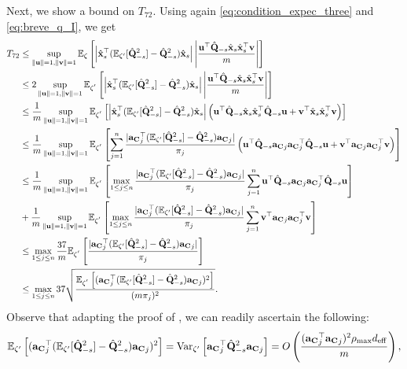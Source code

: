 \documentclass[11pt,a4paper]{article}
\begin{document}
Next, we show a bound on $T_{72}$.
Using again \eqref{eq:condition_expec_three} and \eqref{eq:breve_q_I}, we get
\begin{align}
    T_{72}&\leq\sup\limits_{\|\mathbf{u}\|=1,\|\mathbf{v}\|=1} {\mathbb{E}}_{\zeta}\left[\left|\hat{\mathbf{x}}_s^\top({\mathbb{E}}_{\zeta'}[\hat{\mathbf{Q}}^2_{-s}]-\hat{\mathbf{Q}}^2_{-s})\hat{\mathbf{x}}_s\right |\left|\frac{\mathbf{u}^\top\hat{\mathbf{Q}}_{-s}\hat{\mathbf{x}}_s\hat{\mathbf{x}}_s^\top\mathbf{v}}{m}\right|\right]\nonumber\\
    &\leq2\sup\limits_{\|\mathbf{u}\|=1,\|\mathbf{v}\|=1} {\mathbb{E}}_{\zeta^{'}}\left[\left|\hat{\mathbf{x}}_s^\top({\mathbb{E}}_{\zeta'}[\hat{\mathbf{Q}}^2_{-s}]-\hat{\mathbf{Q}}^2_{-s})\hat{\mathbf{x}}_s\right |\left|\frac{\mathbf{u}^\top\hat{\mathbf{Q}}_{-s}\hat{\mathbf{x}}_s\hat{\mathbf{x}}_s^\top\mathbf{v}}{m}\right|\right]\nonumber\\
    &\leq\frac{1}{m}\sup\limits_{\|\mathbf{u}\|=1,\|\mathbf{v}\|=1} {\mathbb{E}}_{\zeta^{'}}\left[\left|\hat{\mathbf{x}}_s^\top({\mathbb{E}}_{\zeta'}[\hat{\mathbf{Q}}^2_{-s}]-\hat{\mathbf{Q}}^2_{-s})\hat{\mathbf{x}}_s\right |\left(\mathbf{u}^\top\hat{\mathbf{Q}}_{-s}\hat{\mathbf{x}}_s\hat{\mathbf{x}}_s^\top\hat{\mathbf{Q}}_{-s}\mathbf{u}+\mathbf{v}^\top\hat{\mathbf{x}}_s\hat{\mathbf{x}}_s^\top\mathbf{v}\right)\right]\nonumber\\
    &\leq\frac{1}{m}\sup\limits_{\|\mathbf{u}\|=1,\|\mathbf{v}\|=1} {\mathbb{E}}_{\zeta^{'}}\left[\sum^n_{j=1}\frac{|{\mathbf{a}_{\mathbf{C}}}_j^\top({\mathbb{E}}_{\zeta'}[\hat{\mathbf{Q}}^2_{-s}]-\hat{\mathbf{Q}}^2_{-s}){\mathbf{a}_{\mathbf{C}}}_j|}{\pi_j}\left(\mathbf{u}^\top\hat{\mathbf{Q}}_{-s}{\mathbf{a}_{\mathbf{C}}}_j{\mathbf{a}_{\mathbf{C}}}_j^\top\hat{\mathbf{Q}}_{-s}\mathbf{u}+\mathbf{v}^\top{\mathbf{a}_{\mathbf{C}}}_j{\mathbf{a}_{\mathbf{C}}}_j^\top\mathbf{v}\right)\right]\nonumber\\
    &\leq\frac{1}{m}\sup\limits_{\|\mathbf{u}\|=1,\|\mathbf{v}\|=1} {\mathbb{E}}_{\zeta^{'}}\left[\max\limits_{1\leq j\leq n}\frac{|{\mathbf{a}_{\mathbf{C}}}_j^\top({\mathbb{E}}_{\zeta'}[\hat{\mathbf{Q}}^2_{-s}]-\hat{\mathbf{Q}}^2_{-s}){\mathbf{a}_{\mathbf{C}}}_j|}{\pi_j}\sum^n_{j=1}\mathbf{u}^\top\hat{\mathbf{Q}}_{-s}{\mathbf{a}_{\mathbf{C}}}_j{\mathbf{a}_{\mathbf{C}}}_j^\top\hat{\mathbf{Q}}_{-s}\mathbf{u}\right]\nonumber\\
    &+\frac{1}{m}\sup\limits_{\|\mathbf{u}\|=1,\|\mathbf{v}\|=1} {\mathbb{E}}_{\zeta^{'}}\left[\max\limits_{1\leq j\leq n}\frac{|{\mathbf{a}_{\mathbf{C}}}_j^\top({\mathbb{E}}_{\zeta'}[\hat{\mathbf{Q}}^2_{-s}]-\hat{\mathbf{Q}}^2_{-s}){\mathbf{a}_{\mathbf{C}}}_j|}{\pi_j}\sum^n_{j=1}\mathbf{v}^\top{\mathbf{a}_{\mathbf{C}}}_j{\mathbf{a}_{\mathbf{C}}}_j^\top\mathbf{v}\right]\nonumber\\
    &\leq\max\limits_{1 \leq j \leq n}\frac{37}{m}{\mathbb{E}}_{\zeta^{'}}\left[\frac{|{\mathbf{a}_{\mathbf{C}}}_j^\top({\mathbb{E}}_{\zeta'}[\hat{\mathbf{Q}}^2_{-s}]-\hat{\mathbf{Q}}^2_{-s}){\mathbf{a}_{\mathbf{C}}}_j|}{\pi_j}\right]\nonumber\\
    &\leq\max\limits_{1 \leq j \leq n} 37\sqrt{\frac{{\mathbb{E}}_{\zeta^{'}}\left[({\mathbf{a}_{\mathbf{C}}}_j^\top({\mathbb{E}}_{\zeta'}[\hat{\mathbf{Q}}^2_{-s}]-\hat{\mathbf{Q}}^2_{-s}){\mathbf{a}_{\mathbf{C}}}_j)^2\right]}{(m\pi_j)^2}}.\nonumber
\end{align}
Observe that   adapting the proof of , we can readily ascertain the following:
\begin{align*}
    {\mathbb{E}}_{\zeta'}\left[({\mathbf{a}_{\mathbf{C}}}_j^\top({\mathbb{E}}_{\zeta'}[\hat{\mathbf{Q}}^2_{-s}]-\hat{\mathbf{Q}}^2_{-s}){\mathbf{a}_{\mathbf{C}}}_j)^2\right] =\operatorname{Var}_{\zeta'}\left[{\mathbf{a}_{\mathbf{C}}}_j^\top\hat{\mathbf{Q}}^2_{-s}{\mathbf{a}_{\mathbf{C}}}_j\right] = O \left(\frac{({\mathbf{a}_{\mathbf{C}}}_j^\top{\mathbf{a}_{\mathbf{C}}}_j)^2\rho_{\max} d_{\mathrm{eff}}}{m}\right),
\end{align*}
\end{document}
